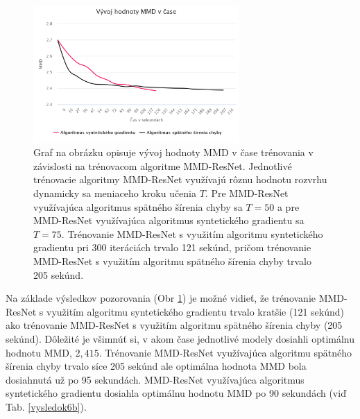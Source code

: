 \begin{figure}
\centerline{\includegraphics[width=0.7\textwidth]{images/experimenty/experiment6.png}}
\caption[Vývoj hodnoty MMD v čase trénovania]{Graf na obrázku opisuje vývoj hodnoty MMD v čase trénovania v závislosti na trénovacom algoritme MMD-ResNet. Jednotlivé trénovacie algoritmy MMD-ResNet využívajú rôznu hodnotu rozvrhu dynamicky sa meniaceho kroku učenia $T$. Pre MMD-ResNet využívajúca algoritmus spätného šírenia chyby sa $T=50$ a pre MMD-ResNet využívajúca algoritmus syntetického gradientu sa $T=75$. Trénovanie MMD-ResNet s využitím algoritmu syntetického gradientu pri 300 iteráciách trvalo 121 sekúnd, pričom trénovanie MMD-ResNet s využitím algoritmu spätného šírenia chyby trvalo 205 sekúnd.}
\label{vysledok6}
\end{figure}

Na základe výsledkov pozorovania (Obr \ref{vysledok6}) je možné vidieť, že trénovanie MMD-ResNet s využitím algoritmu syntetického gradientu trvalo kratšie (121 sekúnd) ako trénovanie MMD-ResNet s využitím algoritmu spätného šírenia chyby (205 sekúnd). Dôležité je všimnúť si, v akom čase jednotlivé modely dosiahli optimálnu hodnotu MMD, $2,415$. Trénovanie MMD-ResNet využívajúca algoritmu spätného šírenia chyby trvalo síce 205 sekúnd ale optimálna hodnota MMD bola dosiahnutá už po 95 sekundách. MMD-ResNet využívajúca algoritmus syntetického gradientu dosiahla optimálnu hodnotu MMD po 90 sekundách (viď Tab. \ref{vysledok6b}).


